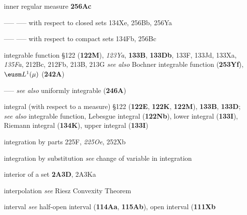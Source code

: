 inner regular measure {\bf 256Ac}





----- ----- with respect to closed sets 134Xe,
  256Bb, 256Ya


----- ----- with respect to compact sets 134Fb,
  256Bc








integrable function \S122 ({\bf 122M}), {\it 123Ya}, {\bf 133B}, {\bf
133Db}, 133F, 133Jd, 133Xa, {\it 135Fa},
  212Bc, 212Fb, 213B, 213G
  {\it see also} Bochner integrable function ({\bf 253Yf}),
$\eusm L^1(\mu)$ ({\bf 242A})


----- {\it see also} uniformly integrable ({\bf 246A})


integral (with respect to a measure)
\S122 ({\bf 122E}, {\bf 122K}, {\bf 122M}), {\bf 133B}, {\bf
133D}; 
  {\it see also}
integrable function, Lebesgue integral ({\bf 122Nb}),
lower integral ({\bf 133I}), Riemann integral ({\bf 134K}), upper integral ({\bf 133I})










integration by parts 225F, {\it 225Oe}, 252Xb


integration by substitution {\it see}
change of variable in integration




interior of a set {\bf 2A3D}, 2A3Ka


interpolation {\it see} Riesz Convexity Theorem









interval
  {\it see}
half-open interval ({\bf 114Aa}, {\bf 115Ab}),
open interval ({\bf 111Xb}





















